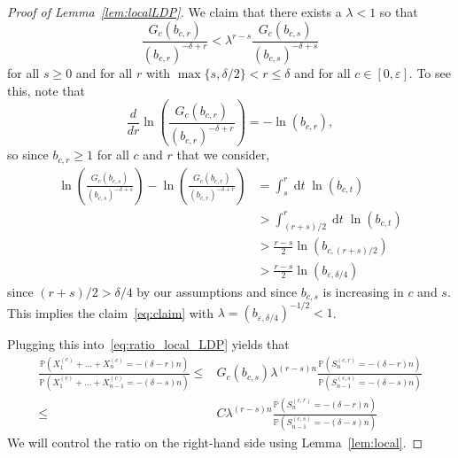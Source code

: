 \documentclass[10pt]{amsart}
\theoremstyle{definition}\newtheorem{defi}[theo]{Definition}\newtheorem{rema}[theo]{Remark}\newtheorem{exam}[theo]{Example}\newtheorem{exem}[theo]{Example}\newtheorem{nota}[theo]{Notation}
\renewcommand{\P}{\mathbb{P}}
\DeclareMathOperator{\dtseq}{d\mathit{t}}
\begin{document}
\begin{proof}[Proof of Lemma~\ref{lem:localLDP}]
We claim that there exists a $\lambda<1$ so that
\begin{equation}\label{eq:claim}
\frac{G_c(b_{c,r}) }{ (b_{c,r})^{ -\delta+r }} <\lambda^{r-s} \frac{ G_c(b_{c,s})}{ (b_{c,s})^{ -\delta+s}}
\end{equation}
for all $s\geq 0$ and for all $r$ with $\max\{s,\delta/2\}< r\le \delta $ and for all $c\in[0,\varepsilon]$. To see this, note that
\[
\frac{d}{dr} \ln\left(\frac{G_c(b_{c,r}) }{ (b_{c,r})^{-\delta+r } }\right)=-\ln(b_{c,r}),
\]
so since $ b_{c,r} \ge1$ for all $c$ and $r$ that we consider,
\begin{align*}
\ln\left(\frac{G_c(b_{c,s}) }{ (b_{c,s})^{-\delta+s }}\right)-\ln\left(\frac{G_c(b_{c,r}) }{ (b_{c,r})^{-\delta+r }}\right)&=\int_s^r \dtseq \ln(b_{c,t})\\
&>\int_{(r+s)/2}^r \dtseq \ln(b_{c,t})\\
&>\frac{r-s}{2}\ln(b_{c,(r+s)/2})\\
&>\frac{r-s}{2}\ln(b_{\varepsilon,\delta/4})
\end{align*}
since $(r+s)/2>\delta/4$ by our assumptions and since $b_{c,s}$ is increasing in $c$ and $s$. This implies the claim~\eqref{eq:claim} with $\lambda=(b_{\varepsilon,\delta/4})^{-1/2}<1$.

Plugging this into~\eqref{eq:ratio_local_LDP} yields that
\begin{align*}
\frac{\P\left(X^{(c)}_1+\dots+X^{(c)}_{n}= -(\delta-r)n\right)}{
\P\left(X^{(c)}_1+\dots+X^{(c)}_{n-1}=-(\delta-s)n\right)}\leq &G_c(b_{c,s}) \lambda^{(r-s)n} \frac{\P\left(S^{(c,r)}_n=-(\delta-r)n\right) }{ \P\left(S^{(c,s)}_{n-1}=-(\delta-s)n\right)}\\
\leq&C \lambda^{(r-s)n} \frac{\P\left(S^{(c,r)}_n=-(\delta-r)n\right) }{ \P\left(S^{(c,s)}_{n-1}=-(\delta-s)n\right)}
\end{align*}
We will control the ratio on the right-hand side using Lemma~\ref{lem:local}.


\end{proof}
\end{document}
